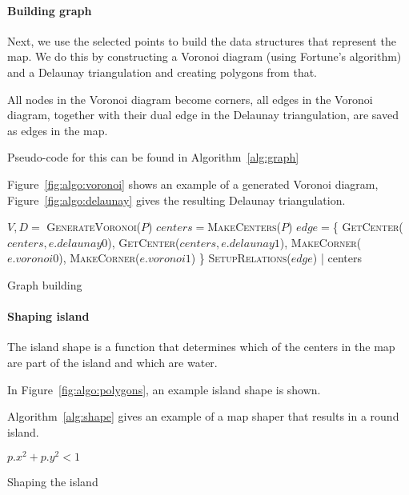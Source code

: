 \paragraph{Building graph}

Next, we use the selected points to build the data structures that represent the map.
We do this by constructing a Voronoi diagram (using Fortune's algorithm) and a Delaunay triangulation and creating polygons from that.

All nodes in the Voronoi diagram become corners, all edges in the Voronoi diagram, together with their dual edge in the Delaunay triangulation, are saved as edges in the map.

Pseudo-code for this can be found in Algorithm~\ref{alg:graph}

Figure~\ref{fig:algo:voronoi} shows an example of a generated Voronoi diagram, Figure~\ref{fig:algo:delaunay} gives the resulting Delaunay triangulation.

\begin{algo*}
\begin{sourcecode}
$V, D =$ \textsc{GenerateVoronoi}($P$)
$centers = $\textsc{MakeCenters}($P$)
	$edge = $\{
		\textsc{GetCenter}($centers, e.delaunay0$),
		\textsc{GetCenter}($centers, e.delaunay1$),
		\textsc{MakeCorner}($e.voronoi0$),
		\textsc{MakeCorner}($e.voronoi1$)
	\}
	\textsc{SetupRelations}($edge$)
|
\return centers
\qend
\end{sourcecode}
	\caption{Graph building}
	\label{alg:graph}
\end{algo*}

\paragraph{Shaping island}

The island shape is a function that determines which of the centers in the map are part of the island and which are water.

In Figure~\ref{fig:algo:polygons}, an example island shape is shown.

Algorithm~\ref{alg:shape} gives an example of a map shaper that results in a round island.

\begin{algo*}
\begin{sourcecode}
\return $p.x^2 + p.y^2 < 1$
\qend
\end{sourcecode}
	\caption{Shaping the island}
	\label{alg:shape}
\end{algo*}

